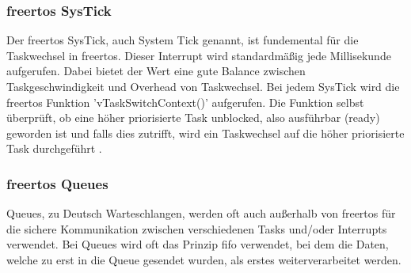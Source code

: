 \documentclass[../EDF Master Thesis.tex]{subfiles}
\begin{document}
\subsubsection{\ac{freertos} SysTick} \label{section:freertos_sys_tick}
Der \ac{freertos} SysTick, auch System Tick genannt, ist fundemental für die Taskwechsel in \ac{freertos}.
Dieser Interrupt wird standardmäßig jede Millisekunde aufgerufen.
Dabei bietet der Wert eine gute Balance zwischen Taskgeschwindigkeit und Overhead von Taskwechsel.
Bei jedem SysTick wird die \ac{freertos} Funktion 'vTaskSwitchContext()' aufgerufen.
Die Funktion selbst überprüft, ob eine höher priorisierte Task unblocked, also ausführbar (ready) geworden ist und falls dies zutrifft, wird ein Taskwechsel auf die höher priorisierte Task durchgeführt \autocite{freertos_systick}.

\subsubsection{\ac{freertos} Queues} \label{section:queues}
Queues, zu Deutsch Warteschlangen, werden oft auch außerhalb von \ac{freertos} für die sichere Kommunikation zwischen verschiedenen Tasks und/oder Interrupts verwendet.
Bei Queues wird oft das Prinzip \ac{fifo} verwendet, bei dem die Daten, welche zu erst in die Queue gesendet wurden, als erstes weiterverarbeitet werden.
\end{document}
